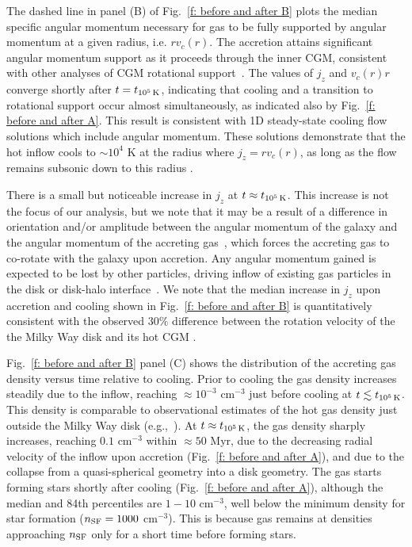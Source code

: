\documentclass[fleqn,usenatbib]{mnras}
\newcommand{\tcools}{t_{10^5\,{\rm K}}}
\begin{document}
The dashed line in panel (B) of Fig.~\ref{f: before and after B} plots the median specific angular momentum necessary for gas to be fully supported by angular momentum at a given radius, i.e. $rv_c(r)$.
The accretion attains significant angular momentum support as it proceeds through the inner CGM, consistent with other analyses of CGM rotational support~\citep{Oppenheimer2018, Trapp2021}.
The values of $j_z$ and $v_c(r)r$ converge shortly after $t=\tcools$, indicating that cooling and a transition to rotational support occur almost simultaneously, as indicated also by Fig.~\ref{f: before and after A}.
This result is consistent with 1D steady-state cooling flow solutions which include angular momentum.
These solutions demonstrate that the hot inflow cools to $\sim10^4$ K at the radius where $j_z=r v_c(r)$, as long as the flow remains subsonic down to this radius \citep{Cowie1980, Stern2020}.

There is a small but noticeable increase in $j_z$ at $t \approx \tcools$.
This increase is not the focus of our analysis, but we note that it may be a result of a difference in orientation and/or amplitude between the angular momentum of the galaxy and the angular momentum of the accreting gas~\citep[e.g.][]{Danovich2012, DeFelippis2017}, which forces the accreting gas to co-rotate with the galaxy upon accretion.
Any angular momentum gained is expected to be lost by other particles, driving inflow of existing gas particles in the disk or disk-halo interface~\citep[e.g.][]{Mayor1981, Pezzulli2017}.
We note that the median increase in $j_z$ upon accretion and cooling shown in Fig.~\ref{f: before and after B} is quantitatively consistent with the observed $30\%$ difference between the rotation velocity of the the Milky Way disk and its hot CGM \citep{Hodges-Kluck2016}.

Fig.~\ref{f: before and after B} panel (C) shows the distribution of the accreting gas density versus time relative to cooling.
Prior to cooling the gas density increases steadily due to the inflow, reaching $\approx10^{-3}$ cm$^{-3}$ just before cooling at $t\lesssim\tcools$.
This density is comparable to observational estimates of the hot gas density just outside the Milky Way disk (e.g.,~\citealt{Li2017a}).
At $t\approx\tcools$, the gas density sharply increases, reaching $0.1$ cm$^{-3}$ within $\approx50$ Myr, due to the decreasing radial velocity of the inflow upon accretion (Fig.~\ref{f: before and after A}), and due to the collapse from a quasi-spherical geometry into a disk geometry.
The gas starts forming stars shortly after cooling (Fig.~\ref{f: before and after A}), although the median and 84th percentiles are $1-10$ cm$^{-3}$, well below the minimum density for star formation ($n_{\rm SF} = 1000$ cm$^{-3}$).
This is because gas remains at densities approaching $n_{\rm SF}$ only for a short time before forming stars.
\end{document}
